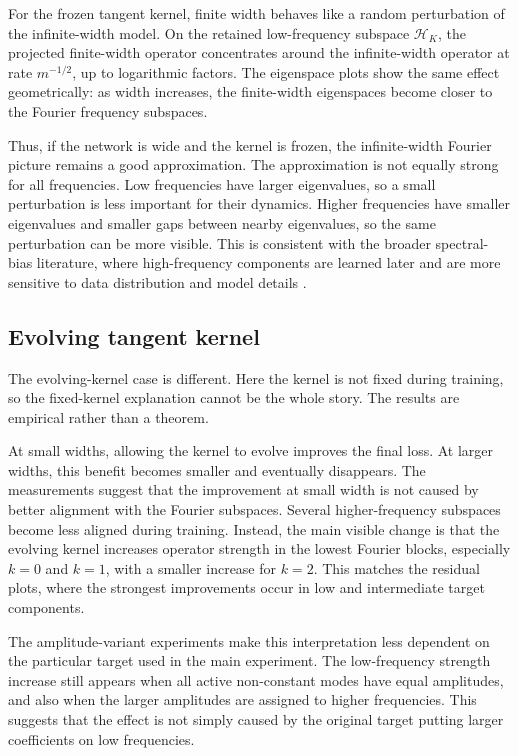 For the frozen tangent kernel, finite width behaves like a random perturbation
of the infinite-width model. On the retained low-frequency subspace
\(\mathcal H_K\), the projected finite-width operator concentrates around the
infinite-width operator at rate \(m^{-1/2}\), up to logarithmic factors. The
eigenspace plots show the same effect geometrically: as width increases, the
finite-width eigenspaces become closer to the Fourier frequency subspaces.

Thus, if the network is wide and the kernel is frozen, the infinite-width
Fourier picture remains a good approximation. The approximation is not equally
strong for all frequencies. Low frequencies have larger eigenvalues, so a small
perturbation is less important for their dynamics. Higher frequencies have
smaller eigenvalues and smaller gaps between nearby eigenvalues, so the same
perturbation can be more visible. This is consistent with the broader
spectral-bias literature, where high-frequency components are learned later and
are more sensitive to data distribution and model details
\citep{rahaman2019spectralbiasneuralnetworks,basri2019convergence,
	basri2020frequencybiasneuralnetworks}.

\subsection{Evolving tangent kernel}
\label{subsec:discussion-q2-evolving}

The evolving-kernel case is different. Here the kernel is not fixed during
training, so the fixed-kernel explanation cannot be the whole story. The results
are empirical rather than a theorem.

At small widths, allowing the kernel to evolve improves the final loss. At
larger widths, this benefit becomes smaller and eventually disappears. The
measurements suggest that the improvement at small width is not caused by better
alignment with the Fourier subspaces. Several higher-frequency subspaces become
less aligned during training. Instead, the main visible change is that the
evolving kernel increases operator strength in the lowest Fourier blocks,
especially \(k=0\) and \(k=1\), with a smaller increase for \(k=2\). This
matches the residual plots, where the strongest improvements occur in low and
intermediate target components.

The amplitude-variant experiments make this interpretation less dependent on
the particular target used in the main experiment. The low-frequency strength
increase still appears when all active non-constant modes have equal amplitudes,
and also when the larger amplitudes are assigned to higher frequencies. This
suggests that the effect is not simply caused by the original target putting
larger coefficients on low frequencies.

